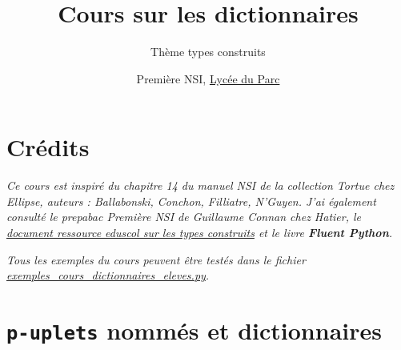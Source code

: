 \documentclass[
  11pt,
]{article}
\title{Cours sur les dictionnaires}
\subtitle{Thème types construits}
\author{Première NSI, \href{https://frederic-junier.org/}{Lycée du
Parc}}
\date{}
\newcounter{exo}
\newcounter{cours}
\begin{document}
\maketitle

\renewcommand*\contentsname{Table des matières}
{
\hypersetup{linkcolor=}
\setcounter{tocdepth}{3}
\tableofcontents
}
\hypertarget{cruxe9dits}{%
\section*{Crédits}\label{cruxe9dits}}

\emph{Ce cours est inspiré du chapitre 14 du manuel NSI de la collection
Tortue chez Ellipse, auteurs : Ballabonski, Conchon, Filliatre, N'Guyen.
J'ai également consulté le prepabac Première NSI de Guillaume Connan
chez Hatier, le
\href{https://cache.media.eduscol.education.fr/file/NSI/77/7/RA_Lycee_G_NSI_repd_types_construits_1170777.pdf}{document
ressource eduscol sur les types construits} et le livre \textbf{Fluent
Python}.}

\emph{Tous les exemples du cours peuvent être testés dans le fichier
\url{exemples_cours_dictionnaires_eleves.py}.}

\hypertarget{p-uplets-nommuxe9s-et-dictionnaires}{%
\section{\texorpdfstring{\texttt{p-uplets} nommés et
dictionnaires}{p-uplets nommés et dictionnaires}}\label{p-uplets-nommuxe9s-et-dictionnaires}}
\end{document}
